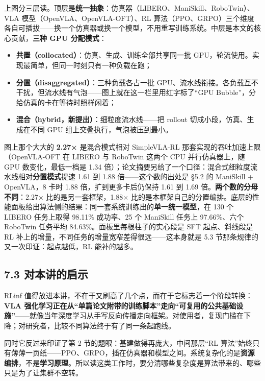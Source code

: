 \documentclass[
  chinese,
]{ctexart}
\providecommand{\tightlist}{%
  \setlength{\itemsep}{0pt}\setlength{\parskip}{0pt}}
\begin{document}
上图分三层读。顶层是\textbf{统一抽象}：仿真器（LIBERO、ManiSkill、RoboTwin）、VLA
模型（OpenVLA、OpenVLA-OFT）、RL
算法（PPO、GRPO）三个维度各自可插拔------换一个仿真器或换一个模型，不用重写训练系统。中层是本文的核心贡献，\textbf{三种
GPU 分配模式}：

\begin{itemize}
\tightlist
\item
  \textbf{共置（collocated）}：仿真、生成、训练全部共享同一批
  GPU，轮流使用。实现最简单，但同一时刻只有一种负载在跑；
\item
  \textbf{分置（disaggregated）}：三种负载各占一批
  GPU、流水线衔接。各负载互不干扰，但流水线有气泡------图上就在这一栏里用红字标了``GPU
  Bubble''，分给仿真的卡在等待时照样闲着；
\item
  \textbf{混合（hybrid，新提出）}：细粒度流水线------把 rollout
  切成小段，仿真、生成在不同 GPU 组上交叠执行，气泡被压到最小。
\end{itemize}

图上那个大大的 \textbf{2.27×} 是混合模式相对 SimpleVLA-RL
那套实现的吞吐加速上限（OpenVLA-OFT 在 LIBERO 与 RoboTwin 这两个 CPU
并行仿真器上，随 GPU 数变化，最低一档是 1.34
倍）；论文摘要另给了一个口径：混合式细粒度流水线相对\textbf{分置模式}提速
1.61 到 1.88 倍------这个数的出处是 §5.2 的 ManiSkill + OpenVLA，8 卡时
1.88 倍，扩到更多卡后仍保持 1.61 到 1.69
倍。\textbf{两个数的分母不同}：2.27× 比的是另一套框架，1.88×
比的是本框架自己的分置编排。底层的性能面板给出算法侧的结果：同一套系统训练出的\textbf{单一统一模型}，在
130 个 LIBERO 任务上取得 98.11\% 成功率、25 个 ManiSkill 任务上
97.66\%、六个 RoboTwin 任务平均 84.63\%。面板里每根柱子的实心段是 SFT
起点、斜线段是 RL 补上的增量，不同任务的增量宽窄差得很远------这本身就是
5.3 节那条规律的又一次印证：起点越低，RL 能补的越多。

\subsection{7.3
对本讲的启示}\label{ux5bf9ux672cux8bb2ux7684ux542fux793a}

RLinf
值得放进本讲，不在于又刷高了几个点，而在于它标志着一个阶段转换：\textbf{VLA
强化学习正在从``单篇论文附带的训练脚本''走向``可复用的公共基础设施''}------就像当年深度学习从手写反向传播走向框架。对使用者，复现门槛在下降；对研究者，比较不同算法终于有了同一条起跑线。

同时它反过来印证了第 2 节的题眼：基建做得再庞大，中间那层``RL
算法''始终只有薄薄一页纸------PPO、GRPO，插在仿真器和模型之间。系统复杂化的是\textbf{资源编排}，不是\textbf{学习原理}。所以读这类工作时，要分清哪些复杂度是算法带来的、哪些只是为了让集群不空转。
\end{document}

